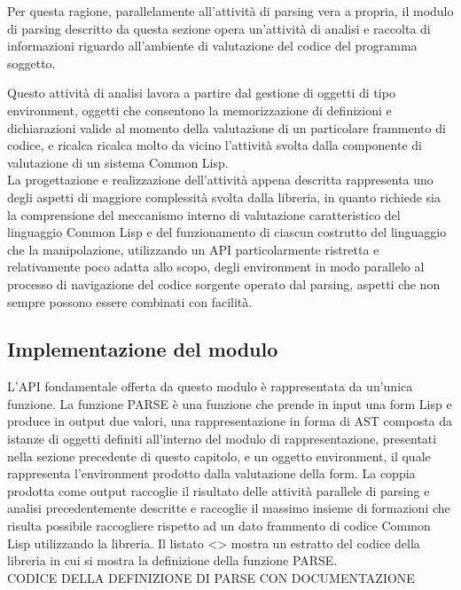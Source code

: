 Per questa ragione, parallelamente all'attività di parsing vera a propria, il
modulo di parsing descritto da questa sezione opera un'attività di analisi e
raccolta di informazioni riguardo all'ambiente di valutazione del codice del
programma soggetto.

Questo attività di analisi lavora a partire dal gestione di oggetti di tipo
environment, oggetti che consentono la memorizzazione di definizioni e
dichiarazioni valide al momento della valutazione di un particolare frammento
di codice, e ricalca ricalca molto da vicino l’attività svolta dalla
componente di valutazione di un sistema Common Lisp.\\

La progettazione e realizzazione dell'attività appena descritta rappresenta
uno degli aspetti di maggiore complessità svolta dalla libreria, in quanto
richiede sia la comprensione del meccanismo interno di valutazione
caratteristico del linguaggio Common Lisp e del funzionamento di ciascun
costrutto del linguaggio che la manipolazione, utilizzando un API
particolarmente ristretta e relativamente poco adatta allo scopo, degli
environment in modo parallelo al processo di navigazione del codice sorgente
operato dal parsing, aspetti che non sempre possono essere combinati con
facilità.

\subsection{Implementazione del modulo}

L’API fondamentale offerta da questo modulo è rappresentata da un’unica
funzione. La funzione PARSE è una funzione che prende in input una form Lisp e
produce in output due valori, una rappresentazione in forma di AST composta da
istanze di oggetti definiti all’interno del modulo di rappresentazione,
presentati nella sezione precedente di questo capitolo, e un oggetto
environment, il quale rappresenta l’environment prodotto dalla valutazione
della form. La coppia prodotta come output raccoglie il risultato delle
attività parallele di parsing e analisi precedentemente descritte e raccoglie
il massimo insieme di formazioni che risulta possibile raccogliere rispetto ad
un dato frammento di codice Common Lisp utilizzando la libreria. Il listato <>
mostra un estratto del codice della libreria in cui si mostra la definizione
della funzione PARSE.\\

CODICE DELLA DEFINIZIONE DI PARSE CON DOCUMENTAZIONE\\

